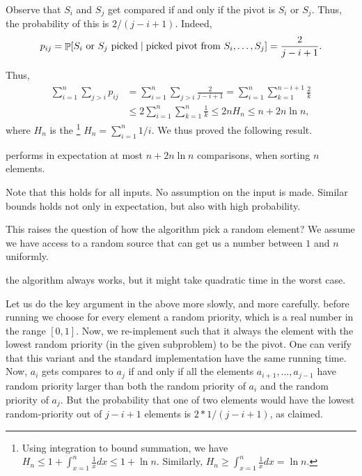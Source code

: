 Observe that $S_i$ and $S_j$ get compared if and only if the pivot is
$S_i$ or $S_j$. Thus, the probability of this is $2/(j-i+1)$. Indeed,
\begin{align*}
  p_{ij}%
  =%
  \ProbCond{S_i\text{ or }S_j \text{ picked}}%
  { \text{picked pivot from } S_i,\ldots, S_j}%
  =%
  \frac{2}{j-i+1}.
\end{align*}

Thus,
\begin{align*}
    \sum_{i=1}^n \sum_{j>i} p_{ij}
    &= \sum_{i=1}^n \sum_{j>i} \frac{2}{j-i+1}
    = \sum_{i=1}^n \sum_{k=1}^{n-i+1} \frac{2}{k} \\
    &\le 2\sum_{i=1}^n \sum_{k=1}^{n} \frac{1}{k}
    \le 2 n H_n \le n + 2n \ln n ,
\end{align*}
where $H_n$ is the \footnote{Using integration
   to bound summation, we have $H_n \leq 1 + \int_{x=1}^{n}
   \frac{1}{x} dx \leq 1 + \ln n$.  Similarly, $H_n \geq
   \int_{x=1}^{n} \frac{1}{x} dx = \ln n$.}
\begin{math}
    H_n = \sum_{i=1}^n {1}/{i}.
\end{math}
We thus proved the following result.

\begin{lemma}
    \QuickSort{} performs in expectation at most $n + 2n \ln n$
    comparisons, when sorting $n$ elements.
\end{lemma}

Note that this holds for all inputs. No assumption on the input is
made. Similar bounds holds not only in expectation, but also with high
probability.

This raises the question of how the algorithm pick a random element?  We
assume we have access to a random source that can get us a number between
$1$ and $n$ uniformly.

 the algorithm always works, but it might take quadratic
time in the worst case.


\begin{remark}
    Let us do the key argument in the above more slowly, and more
    carefully.  before running \QuickSort{} we choose for
    every element a random priority, which is a real number in the
    range $[0,1]$. Now, we re-implement \QuickSort{} such that it
    always  the element with the lowest random priority (in the
    given subproblem) to be the pivot. One can verify that this
    variant and the standard implementation have the same running
    time. Now, $a_i$ gets compares to $a_j$ if and only if all the
    elements $a_{i+1}, \ldots, a_{j-1}$ have random priority larger
    than both the random priority of $a_i$ and the random priority of
    $a_j$. But the probability that one of two elements would have the
    lowest random-priority out of $j-i+1$ elements is $2 * 1/(j-i+1)$,
    as claimed.
\end{remark}


